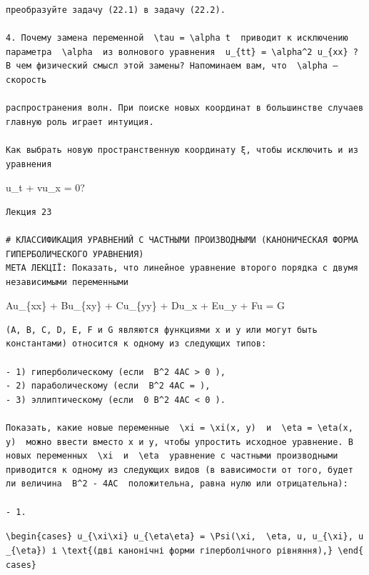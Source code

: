 \documentclass[
  ukrainian,
]{article}
\begin{document}
\begin{verbatim}
преобразуйте задачу (22.1) в задачу (22.2).

4. Почему замена переменной  \tau = \alpha t  приводит к исключению параметра  \alpha  из волнового уравнения  u_{tt} = \alpha^2 u_{xx} ? В чем физический смысл этой замены? Напоминаем вам, что  \alpha —скорость

распространения волн. При поиске новых координат в большинстве случаев главную роль играет интуиция.

Как выбрать новую пространственную координату ξ, чтобы исключить и из уравнения
\end{verbatim}

u\_t + vu\_x = 0?

\begin{verbatim}
Лекция 23

# КЛАССИФИКАЦИЯ УРАВНЕНИЙ С ЧАСТНЫМИ ПРОИЗВОДНЫМИ (КАНОНИЧЕСКАЯ ФОРМА ГИПЕРБОЛИЧЕСКОГО УРАВНЕНИЯ)
МЕТА ЛЕКЦІЇ: Показать, что линейное уравнение второго порядка с двумя независимыми переменными
\end{verbatim}

Au\_\{xx\} + Bu\_\{xy\} + Cu\_\{yy\} + Du\_x + Eu\_y + Fu = G

\begin{verbatim}
(A, B, C, D, E, F и G являются функциями x и y или могут быть константами) относится к одному из следующих типов:

- 1) гиперболическому (если  B^2 4AC > 0 ),
- 2) параболическому (если  B^2 4AC = ),
- 3) эллиптическому (если  0 B^2 4AC < 0 ).

Показать, какие новые переменные  \xi = \xi(x, y)  и  \eta = \eta(x, y)  можно ввести вместо x и y, чтобы упростить исходное уравнение. В новых переменных  \xi  и  \eta  уравнение с частными производными приводится к одному из следующих видов (в вависимости от того, будет ли величина  B^2 - 4AC  положительна, равна нулю или отрицательна):

- 1.
\end{verbatim}

\texttt{\textbackslash{}begin\{cases\}\ u\_\{\textbackslash{}xi\textbackslash{}xi\}\ u\_\{\textbackslash{}eta\textbackslash{}eta\}\ =\ \textbackslash{}Psi(\textbackslash{}xi,\ \ \textbackslash{}eta,\ u,\ u\_\{\textbackslash{}xi\},\ u\_\{\textbackslash{}eta\})\ і\ \textbackslash{}text\{(дві\ канонічні\ форми\ гіперболічного\ рівняння),\}\ \textbackslash{}end\{cases\}}
\end{document}
